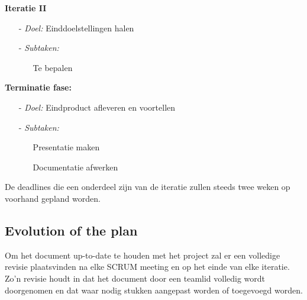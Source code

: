 \documentclass{article}
\begin{document}
\textbf{Iteratie II}
\begin{itemize}
\item[-] \textit{Doel:} Einddoelstellingen halen\\[-5mm]
\item[-] \textit{Subtaken:}\\[-5mm]
\begin{itemize}
	\item[] Te bepalen \\[-5mm]
\end{itemize}
\end{itemize}

\textbf{Terminatie fase:}
\begin{itemize}
\item[-] \textit{Doel:} Eindproduct afleveren en voortellen \\[-5mm]
\item[-] \textit{Subtaken:}\\[-5mm]
\begin{itemize}
	\item[] Presentatie maken \\[-5mm]
	\item[] Documentatie afwerken \\[-5mm]
\end{itemize}
\end{itemize}



De deadlines die een onderdeel zijn van de iteratie zullen steeds twee weken op voorhand gepland worden.

\subsection{Evolution of the plan}

Om het document up-to-date te houden met het project zal er een volledige revisie plaatsvinden na elke SCRUM meeting en op het einde van elke iteratie. Zo'n revisie houdt in dat het document door een teamlid volledig wordt doorgenomen en dat waar nodig stukken aangepast worden of toegevoegd worden.


\newpage
\end{document}
